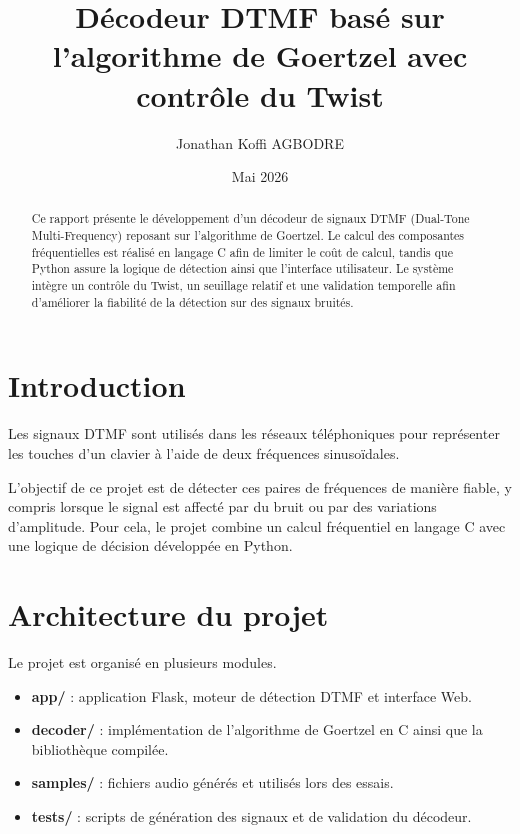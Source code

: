 \documentclass[12pt,a4paper]{article}
\title{Décodeur DTMF basé sur l'algorithme de Goertzel avec contrôle du Twist}
\author{Jonathan Koffi AGBODRE}
\date{Mai 2026}
\begin{document}
\maketitle

\begin{abstract}
Ce rapport présente le développement d'un décodeur de signaux DTMF (Dual-Tone Multi-Frequency) reposant sur l'algorithme de Goertzel. Le calcul des composantes fréquentielles est réalisé en langage C afin de limiter le coût de calcul, tandis que Python assure la logique de détection ainsi que l'interface utilisateur. Le système intègre un contrôle du Twist, un seuillage relatif et une validation temporelle afin d'améliorer la fiabilité de la détection sur des signaux bruités.
\end{abstract}

\section{Introduction}

Les signaux DTMF sont utilisés dans les réseaux téléphoniques pour représenter les touches d'un clavier à l'aide de deux fréquences sinusoïdales.

L'objectif de ce projet est de détecter ces paires de fréquences de manière fiable, y compris lorsque le signal est affecté par du bruit ou par des variations d'amplitude. Pour cela, le projet combine un calcul fréquentiel en langage C avec une logique de décision développée en Python.

\section{Architecture du projet}

Le projet est organisé en plusieurs modules.

\begin{itemize}

\item \textbf{app/} : application Flask, moteur de détection DTMF et interface Web.

\item \textbf{decoder/} : implémentation de l'algorithme de Goertzel en C ainsi que la bibliothèque compilée.

\item \textbf{samples/} : fichiers audio générés et utilisés lors des essais.

\item \textbf{tests/} : scripts de génération des signaux et de validation du décodeur.

\end{itemize}
\end{document}
